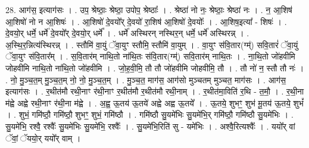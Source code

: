 \documentclass[17pt]{extarticle}
\begin{document}
28. आग॑स॒ इत्याग॑सः । . उप॒ श्रेष्ठाः॒ श्रेष्ठा॒ उपोप॒ श्रेष्ठाः᳚ । . श्रेष्ठा॑ नो नः॒ श्रेष्ठाः॒ श्रेष्ठा॑ नः । . न॒ आ॒शिष॑ आ॒शिषो॑ नो न आ॒शिषः॑ । . आ॒शिषो॑ दे॒वयो᳚र् दे॒वयो॑ रा॒शिष॑ आ॒शिषो॑ दे॒वयोः᳚ । . आ॒शिष॒इत्या᳚ - शिषः॑ । . दे॒वयो॒र् धर्मे॒ धर्मे॑ दे॒वयो᳚र् दे॒वयो॒र् धर्मे᳚ । . धर्मे॑ अस्थिरन् नस्थिर॒न् धर्मे॒ धर्मे॑ अस्थिरन्न् । . अ॒स्थि॒र॒न्नित्य॑स्थिरन्न् । . स्तौमि॑ वा॒युं ॅवा॒युꣳ स्तौमि॒ स्तौमि॑ वा॒युम् । . वा॒युꣳ स॑वि॒तार(ग्म्॑) सवि॒तारं॑ ॅवा॒युं ॅवा॒युꣳ स॑वि॒तार᳚म् । . स॒वि॒तार॑म् नाथि॒तो ना॑थि॒तः स॑वि॒तार(ग्म्॑) सवि॒तार॑म् नाथि॒तः । . ना॒थि॒तो जो॑हवीमि जोहवीमि नाथि॒तो ना॑थि॒तो जो॑हवीमि । . जो॒ह॒वी॒मि॒ तौ तौ जो॑हवीमि जोहवीमि॒ तौ । . तौ नो॑ न॒ स्तौ तौ नः॑ । . नो॒ मु॒ञ्च॒त॒म् मु॒ञ्च॒त॒म् नो॒ नो॒ मु॒ञ्च॒त॒म् । . मु॒ञ्च॒त॒ माग॑स॒ आग॑सो मुञ्चतम् मुञ्चत॒ माग॑सः । . आग॑स॒ इत्याग॑सः । . र॒थीत॑मौ रथी॒नाꣳ र॑थी॒नाꣳ र॒थीत॑मौ र॒थीत॑मौ रथी॒नाम् । . र॒थीत॑मा॒विति॑ र॒थि - त॒मौ॒ । . र॒थी॒ना म॑ह्वे अह्वे रथी॒नाꣳ र॑थी॒ना म॑ह्वे । . अ॒ह्व॒ ऊ॒तय॑ ऊ॒तये॑ अह्वे अह्व ऊ॒तये᳚ । . ऊ॒तये॒ शुभꣳ॒॒ शुभ॑ मू॒तय॑ ऊ॒तये॒ शुभं᳚ । . शुभं॒ गमि॑ष्ठौ॒ गमि॑ष्ठौ॒ शुभꣳ॒॒ शुभं॒ गमि॑ष्ठौ । . गमि॑ष्ठौ सु॒यमे॑भिः सु॒यमे॑भि॒र् गमि॑ष्ठौ॒ गमि॑ष्ठौ सु॒यमे॑भिः । . सु॒यमे॑भि॒ रश्वै॒ रश्वैः᳚ सु॒यमे॑भिः सु॒यमे॑भि॒ रश्वैः᳚ । . सु॒यमे॑भि॒रिति॑ सु - यमे॑भिः । . अश्वै॒रित्यश्वैः᳚ । . ययो᳚र् वां ॅवां॒ ॅययो॒र् ययो᳚र् वाम् । \newline
\end{document}
